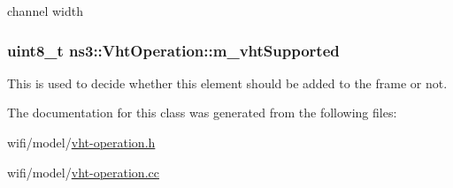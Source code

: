 channel width 

\subsubsection[{\texorpdfstring{m\+\_\+vht\+Supported}{m_vhtSupported}}]{\setlength{\rightskip}{0pt plus 5cm}uint8\+\_\+t ns3\+::\+Vht\+Operation\+::m\+\_\+vht\+Supported\hspace{0.3cm}{\ttfamily [private]}}\hypertarget{classns3_1_1VhtOperation_ac3202e017f07e6e3f00d1796c88f9105}{}\label{classns3_1_1VhtOperation_ac3202e017f07e6e3f00d1796c88f9105}


This is used to decide whether this element should be added to the frame or not. 



The documentation for this class was generated from the following files\+:\begin{DoxyCompactItemize}
\item 
wifi/model/\hyperlink{vht-operation_8h}{vht-\/operation.\+h}\item 
wifi/model/\hyperlink{vht-operation_8cc}{vht-\/operation.\+cc}\end{DoxyCompactItemize}
